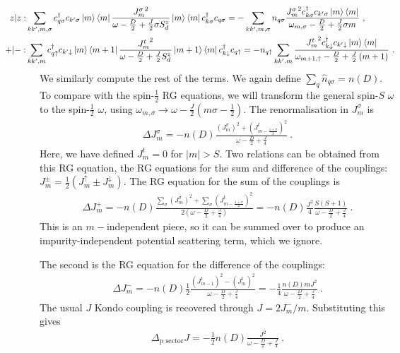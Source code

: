 \documentclass[12pt]{iopart}
\begin{document}
\begin{eqnarray}
	\hspace*{-40pt}z|z: & \sum_{kk^\prime,m,\sigma} c^\dagger_{q \sigma} c_{k^\prime \sigma} \ket{m}\bra{m}\frac{{J^\sigma_m}^2}{\omega - \frac{D}{2} + \frac{J}{2}\sigma S_d^z}\ket{m}\bra{m} c^\dagger_{k \sigma}c_{q \sigma} = -\sum_{kk^\prime,m,\sigma}n_{q \sigma}\frac{{J^\sigma_m}^2 c^\dagger_{k \sigma}c_{k^\prime\sigma} \ket{m}\bra{m}}{\omega_{m, \sigma} - \frac{D}{2} + \frac{J}{2}\sigma m}~,\nonumber\\
	\hspace*{-40pt}+|-: & \sum_{kk^\prime,m} c^\dagger_{q \uparrow} c_{k^\prime \downarrow} \ket{m}\bra{m+1}\frac{{J^t_m}^2}{\omega - \frac{D}{2} + \frac{J}{2}S_d^z}\ket{m+1}\bra{m} c^\dagger_{k \downarrow}c_{q \uparrow} = -n_{q \uparrow}\sum_{kk^\prime,m}\frac{{J^t_m}^2 c^\dagger_{k \downarrow}c_{k^\prime\downarrow} \ket{m}\bra{m}}{\omega_{m+1, \uparrow} - \frac{D}{2} + \frac{J}{2}\left( m+1 \right) }~.
\end{eqnarray}
We similarly compute the rest of the terms. We again define \(\sum_q \hat n_{q\sigma} = n(D)\). To compare with the spin-\(\frac{1}{2}\) RG equations, we will transform the general spin-\(S\) \(\omega\) to the spin-\(\frac{1}{2}\) \( \omega\), using \(\omega_{m,\sigma} \to \omega - \frac{J}{2}\left(m\sigma - \frac{1}{2}\right)\).
The renormalisation in \(J^\sigma_m\) is
\begin{eqnarray}
	\Delta J^\sigma_{m} = - n(D) \frac{\left( J^\sigma_m \right) ^2 + \left( J^t_{m-\frac{1+\sigma}{2}} \right) ^2}{\omega - \frac{D}{2} + \frac{J}{4}}~.
\end{eqnarray}
Here, we have defined \(J^t_m = 0\) for \( |m| > S\). Two relations can be obtained from this RG equation, the RG equations for the sum and difference of the couplings: \(J^\pm_m = \frac{1}{2}\left(J^\uparrow_m \pm J^\downarrow_m\right) \). The RG equation for the sum of the couplings is
\begin{eqnarray}
	\Delta J^+_m = -n(D)\frac{\sum_\sigma \left( J^\sigma_m \right) ^2 + \sum_\sigma \left( J^t_{m-\frac{1+\sigma}{2}} \right) ^2}{2\left(\omega - \frac{D}{2} + \frac{J}{4}\right)} = -n(D)\frac{J^2}{4}\frac{S(S+1)}{\omega - \frac{D}{2} + \frac{J}{4}}~.
\end{eqnarray}
This is an \(m-\)independent piece, so it can be summed over to produce an impurity-independent potential scattering term, which we ignore. 

The second is the RG equation for the difference of the couplings:
\begin{eqnarray}
	\Delta J^-_m = -n(D)\frac{1}{2}\frac{\left( J^t_{m-1} \right) ^2 - \left(J^t_{m}\right) ^2}{\omega - \frac{D}{2} + \frac{J}{4}} = -\frac{1}{4}\frac{n(D) m J^2}{\omega - \frac{D}{2} + \frac{J}{4}}~.
\end{eqnarray}
The usual \(J\) Kondo coupling is recovered through \(J = 2J^-_m/m\). Substituting this gives 
\begin{eqnarray}
	\Delta_\text{p sector} J = -\frac{1}{2}n(D)\frac{J^2}{\omega - \frac{D}{2} + \frac{J}{4}}~.
\end{eqnarray}
\end{document}
